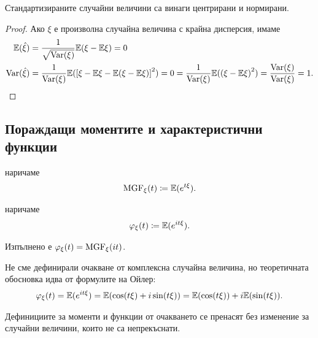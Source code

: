 \documentclass[numbers=endperiod, bibliography=totocnumbered]{scrartcl}
\begin{document}
\begin{proposition}
  Стандартизираните случайни величини са винаги центрирани и нормирани.
\end{proposition}
\begin{proof}
  Ако \( \xi \) е произволна случайна величина с крайна дисперсия, имаме
  \begin{align*}
    \mathbb{E}(\hat \xi)
    &=
    \frac 1 {\sqrt{\operatorname{Var}(\xi)}} \mathbb{E}(\xi - \mathbb{E}\xi)
    =
    0
    \\
    \operatorname{Var}(\hat \xi)
    &=
    \frac 1 {\operatorname{Var}(\xi)} \mathbb{E}({\left[ \xi - \mathbb{E}\xi - \mathbb{E}(\xi - \mathbb{E}\xi) \right]}^2) = 0
    =
    \frac 1 {\operatorname{Var}(\xi)} \mathbb{E}({(\xi - \mathbb{E}\xi)}^2)
    =
    \frac {\operatorname{Var}(\xi)} {\operatorname{Var}(\xi)}
    =
    1.
  \end{align*}
\end{proof}

\subsection{Пораждащи моментите и характеристични функции}

\begin{definition}
   наричаме
  \begin{align*}
    \operatorname{MGF}_\xi (t) \coloneqq \mathbb{E}(e^{t\xi}).
  \end{align*}

   наричаме
  \begin{align*}
    \varphi_\xi (t) \coloneqq \mathbb{E}(e^{it\xi}).
  \end{align*}

  Изпълнено е \( \varphi_\xi(t) = \operatorname{MGF}_\xi(it) \).
\end{definition}

\begin{note}
  Не сме дефинирали очакване от комплексна случайна величина, но теоретичната обосновка идва от формулите на Ойлер:
  \begin{align*}
    \varphi_\xi (t)
    =
    \mathbb{E}(e^{it\xi})
    =
    \mathbb{E}(\cos(t\xi) + i\sin(t\xi))
    =
    \mathbb{E}(\cos(t\xi)) + i \mathbb{E}(\sin(t\xi)).
  \end{align*}
\end{note}

\begin{note}
  Дефинициите за моменти и функции от очакването се пренасят без изменение за случайни величини, които не са непрекъснати.
\end{note}
\end{document}
